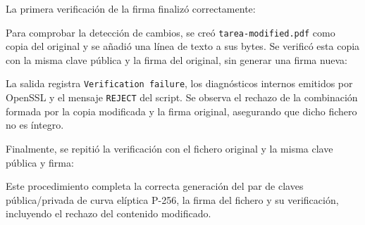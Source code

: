La primera verificación de la firma finalizó correctamente:

\noindent\begin{minipage}{\linewidth}
\begingroup
\renewcommand{\lstlistingname}{Salida y verificación}

\endgroup
\end{minipage}

Para comprobar la detección de cambios, se creó \texttt{tarea-modified.pdf} como copia del original y se añadió una línea de texto a sus bytes.
Se verificó esta copia con la misma clave pública y la firma del original, sin generar una firma nueva:

\noindent\begin{minipage}{\linewidth}
\begingroup
\renewcommand{\lstlistingname}{Salida y verificación}

\endgroup
\end{minipage}

La salida registra \texttt{Verification failure}, los diagnósticos internos emitidos por OpenSSL y el mensaje \texttt{REJECT} del script.
Se observa el rechazo de la combinación formada por la copia modificada y la firma original, asegurando que dicho fichero no es íntegro.

Finalmente, se repitió la verificación con el fichero original y la misma clave pública y firma:

\noindent\begin{minipage}{\linewidth}
\begingroup
\renewcommand{\lstlistingname}{Salida y verificación}

\endgroup
\end{minipage}

Este procedimiento completa la correcta generación del par de claves pública/privada de curva elíptica P-256, la firma del fichero y su verificación, incluyendo el rechazo del contenido modificado.
